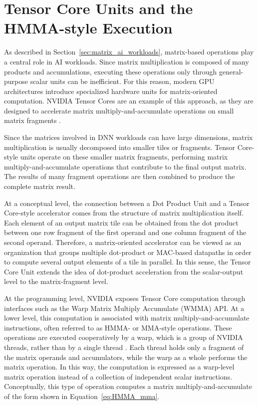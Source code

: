 \section{Tensor Core Units and the HMMA-style Execution}
\label{sec:tensor_core_HMMA}

As described in Section~\ref{sec:matrix_ai_workloads}, matrix-based operations play a central role in AI workloads. Since matrix multiplication is composed of many products and accumulations, executing these operations only through general-purpose scalar units can be inefficient. For this reason, modern GPU architectures introduce specialized hardware units for matrix-oriented computation. NVIDIA Tensor Cores are an example of this approach, as they are designed to accelerate matrix multiply-and-accumulate operations on small matrix fragments \cite{nvidia2017volta,markidis2018tensorcore}.

Since the matrices involved in DNN workloads can have large dimensions,
matrix multiplication is usually decomposed into smaller tiles or
fragments. Tensor Core-style units operate on these smaller matrix
fragments, performing matrix multiply-and-accumulate operations that
contribute to the final output matrix. The results of many fragment
operations are then combined to produce the complete matrix result.

At a conceptual level, the connection between a Dot Product Unit and a Tensor Core-style accelerator comes from the structure of matrix multiplication itself. Each element of an output matrix tile can be obtained from the dot product between one row fragment of the first operand and one column fragment of the second operand. Therefore, a matrix-oriented accelerator can be viewed as an organization that groups multiple dot-product or MAC-based datapaths in order to compute several output elements of a tile in parallel. In this sense, the Tensor Core Unit extends the idea of dot-product acceleration from the scalar-output level to the matrix-fragment level.

At the programming level, NVIDIA exposes Tensor Core computation through interfaces such as the Warp Matrix Multiply Accumulate (WMMA) API. At a lower level, this computation is associated with matrix multiply-and-accumulate instructions, often referred to as HMMA- or MMA-style operations. These operations are executed cooperatively by a warp, which is a group of NVIDIA threads, rather than by a single thread \cite{raihan2019modeling}. Each thread holds only a fragment of the matrix operands and accumulators, while the warp as a whole performs the matrix operation. In this way, the computation is expressed as a warp-level matrix operation instead of a collection of independent scalar instructions. Conceptually, this type of operation computes a matrix multiply-and-accumulate of the form shown in Equation~\eqref{eq:HMMA_mma}.

